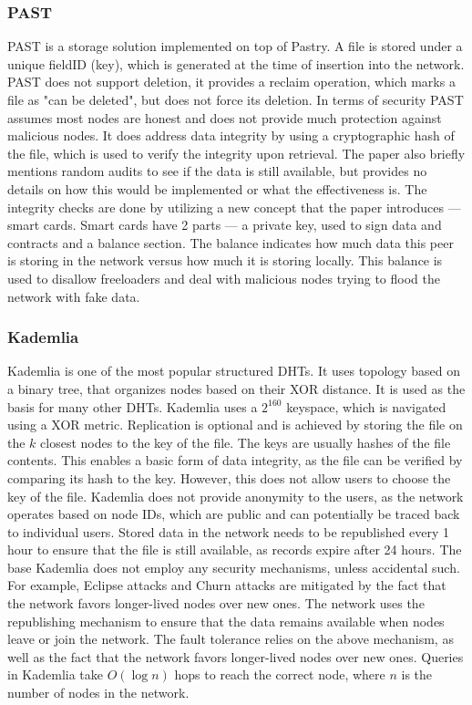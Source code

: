 \subsubsection{PAST}

PAST \cite{past} is a storage solution implemented on top of Pastry.
A file is stored under a unique fieldID (key),
which is generated at the time of insertion into the network.
PAST does not support deletion, it provides a reclaim operation, which marks a file as
"can be deleted", but does not force its deletion.
In terms of security PAST assumes most nodes are honest and does not provide much protection against
malicious nodes.
It does address data integrity by using a cryptographic hash of the file,
which is used to verify the integrity upon retrieval.
The paper also briefly mentions random audits to see if the data is still available,
but provides no details on how this would be implemented or what the effectiveness is.
The integrity checks are done by utilizing a new concept that the paper introduces --- smart cards.
Smart cards have 2 parts --- a private key, used to sign data and contracts and a balance section.
The balance indicates how much data this peer is storing in the network versus how much it is storing locally.
This balance is used to disallow freeloaders and deal with malicious nodes trying to flood the
network with fake data.

\subsubsection{Kademlia}

Kademlia \cite{kademlia} is one of the most popular structured DHTs.
It uses topology based on a binary tree, that organizes nodes based on their XOR distance.
It is used as the basis for many other DHTs.
Kademlia uses a $2^{160}$ keyspace, which is navigated using a XOR metric.
Replication is optional and is achieved by storing the file on the $k$ closest nodes to the key of the file.
The keys are usually hashes of the file contents.
This enables a basic form of data integrity, as the file can be verified by comparing its hash to the key.
However, this does not allow users to choose the key of the file.
Kademlia does not provide anonymity to the users, as the network operates based on node IDs,
which are public and can potentially be traced back to individual users.
Stored data in the network needs to be republished every 1 hour to ensure that the file is still available,
as records expire after 24 hours.
The base Kademlia does not employ any security mechanisms, unless accidental such.
For example, Eclipse attacks and Churn attacks are mitigated by
the fact that the network favors longer-lived nodes over new ones.
The network uses the republishing mechanism to ensure that the data remains available when nodes
leave or join the network.
The fault tolerance relies on the above mechanism,
as well as the fact that the network favors longer-lived nodes over new ones.
Queries in Kademlia take $O(\log n)$ hops to reach the correct node, where $n$ is the number of nodes in the network.

